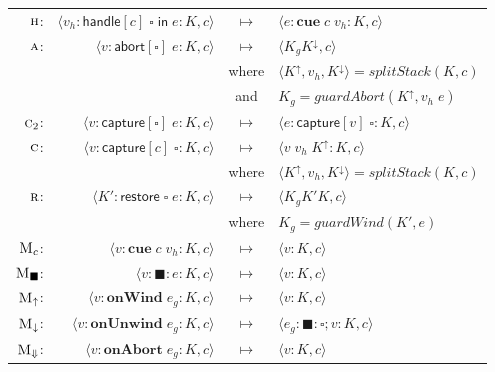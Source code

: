 \documentclass[11pt]{article}
\newcommand{\tuple}[1]{\langle{}{#1}\rangle{}}
\newcommand{\handle}[3]{\textsf{handle}[#1]\;#2\;\textsf{in}\;#3}
\newcommand{\abort}[2]{\textsf{abort}[#1]\;#2}
\newcommand{\capture}[2]{\textsf{capture}[#1]\;#2}
\newcommand{\pushSubcont}[2]{\textsf{restore}\;#1\;#2}
\begin{document}
\begin{figure}[h!]
\begin{tabular}{rrcl}
$\textsc{h}$: & $\tuple{v_h : \handle{c}{\square}{e} : K,c}$ & $\longmapsto$ & $\tuple{ e : \textbf{cue}\;c\;v_h : K,c}$ \\
$\textsc{a}$: & $\tuple{v : \abort{\square}{e} : K,c}$ & $\longmapsto$ & $\tuple{K_gK^\downarrow,c}$ \\
& & where & $\tuple{K^\uparrow, v_h, K^\downarrow} = splitStack(K, c)$ \\
& & and & $K_g = guardAbort(K^\uparrow, v_h\;e)$ \\
$\textsc{c}_2$: & $\tuple{v : \capture{\square}{e} : K,c}$ & $\longmapsto$ & $\tuple{e : \capture{v}{\square} : K,c}$ \\
$\textsc{c}$: & $\tuple{v : \capture{c}{\square} : K,c}$ & $\longmapsto$ & $\tuple{v\;v_h\;K^\uparrow : K,c}$ \\
& & where & $\tuple{K^\uparrow, v_h, K^\downarrow} = splitStack(K, c)$ \\
$\textsc{r}$: & $\tuple{K' : \pushSubcont{\square}{e} : K,c}$ & $\longmapsto$ & $\tuple{K_gK'K,c}$ \\
& & where & $K_g = guardWind(K', e)$ \\
$\textsc{M}_c$: & $\tuple{v : \textbf{cue}\;c\;v_h : K,c}$ & $\longmapsto$ & $\tuple{v : K,c}$ \\
$\textsc{M}_\blacksquare$: & $\tuple{v : \blacksquare : e : K,c}$ & $\longmapsto$ & $\tuple{v : K,c}$ \\
$\textsc{M}_\uparrow$: & $\tuple{v : \textbf{onWind}\;e_g : K,c}$ & $\longmapsto$ & $\tuple{v : K,c}$ \\
$\textsc{M}_\downarrow$: & $\tuple{v : \textbf{onUnwind}\;e_g : K,c}$ & $\longmapsto$ & $\tuple{e_g : \blacksquare : \square; v : K,c}$ \\
$\textsc{M}_\Downarrow$: & $\tuple{v : \textbf{onAbort}\;e_g : K,c}$ & $\longmapsto$ & $\tuple{v : K,c}$ \\
\end{tabular}
\end{figure}
\end{document}
